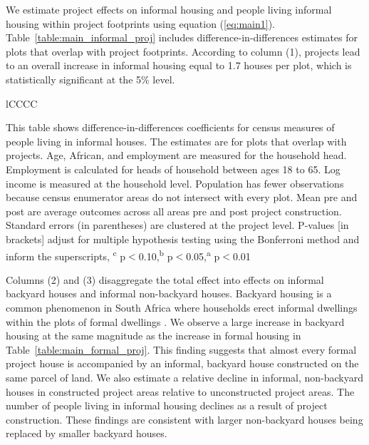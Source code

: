 \documentclass[12pt]{article}
\newcommand{\regtextfirst}{
Mean pre and post are average outcomes across all areas pre and post project construction.  Standard errors (in parentheses) are clustered at the project level.  P-values [in brackets] adjust for multiple hypothesis testing using the Bonferroni method and inform the superscripts, \textsuperscript{c} p$<$0.10,\textsuperscript{b} p$<$0.05,\textsuperscript{a} p$<$0.01 \,\,
}
\newcommand{\rv}{}
\begin{document}
\rv{We estimate project effects on informal housing and people living informal housing within project footprints using equation (\ref{eq:main1}).  Table~\ref{table:main_informal_proj} includes difference-in-differences estimates for plots that overlap with project footprints.  According to column (1), projects lead to an overall increase in informal housing equal to 1.7 houses per plot, which is statistically significant at the 5\% level. }

\begin{table}[h!]
\small
\centering
\caption{Direct Effects on Informal Housing and Inhabitants}\label{table:main_informal_proj}
\vspace{-2mm}
\begin{threeparttable}
\begin{tabular}{lCCCC}
\toprule

\bottomrule
\end{tabular}
\begin{tablenotes}
\item \footnotesize 
 This table shows difference-in-differences coefficients for census measures of people living in informal houses.  The estimates are for plots that overlap with projects. Age, African, and employment are measured for the household head.  Employment is calculated for heads of household between ages 18 to 65.  Log income is measured at the household level. Population has fewer observations because census enumerator areas do not intersect with every plot.   \regtextfirst
\end{tablenotes}
\end{threeparttable}
\end{table}

\rv{Columns (2) and (3) disaggregate the total effect into effects on informal backyard houses and informal non-backyard houses.  Backyard housing is a common phenomenon in South Africa where households erect informal dwellings within the plots of formal dwellings \citep{Brueckner2018backyarding}.  We observe a large increase in backyard housing at the same magnitude as the increase in formal housing in Table~\ref{table:main_formal_proj}.  This finding suggests that almost every formal project house is accompanied by an informal, backyard house constructed on the same parcel of land.  We also estimate a relative decline in informal, non-backyard houses in constructed project areas relative to unconstructed project areas.  The number of people living in informal housing declines as a result of project construction.  These findings are consistent with larger non-backyard houses being replaced by smaller backyard houses.}
\end{document}
